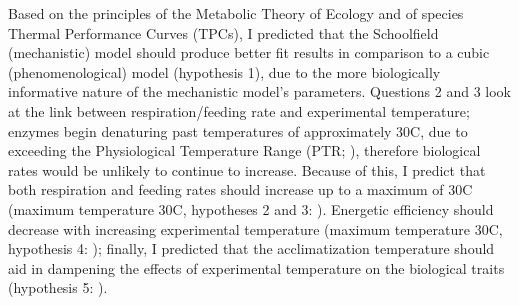 \documentclass[../../Paper.tex]{subfiles}
\begin{document}
Based on the principles of the Metabolic Theory of Ecology and of species Thermal Performance Curves (TPCs),
I predicted that the Schoolfield (mechanistic) model should produce better fit results in comparison to
a cubic (phenomenological) model (hypothesis 1), due to the more biologically informative nature of the mechanistic model's parameters.
Questions 2 and 3 look at the link between respiration/feeding rate and experimental temperature; enzymes begin denaturing
past temperatures of approximately 30\degree C, due to exceeding the Physiological Temperature Range (PTR; \cite{savage_effects_2004,pawar_real_2016}), therefore biological rates would be unlikely to continue to increase. Because of this, I predict that both respiration and feeding rates 
should increase up to a maximum of 30\degree C (maximum temperature 30\degree C, hypotheses 2 and 3:
\cite{gillooly_effects_2001}).
Energetic efficiency should decrease with increasing experimental temperature (maximum temperature 30\degree C, hypothesis 4:
\cite{savage_effects_2004}); finally, I predicted that the acclimatization temperature should aid in dampening the effects of experimental
temperature on the biological traits (hypothesis 5: \cite{marshall_warming_2011}).







\end{document}
